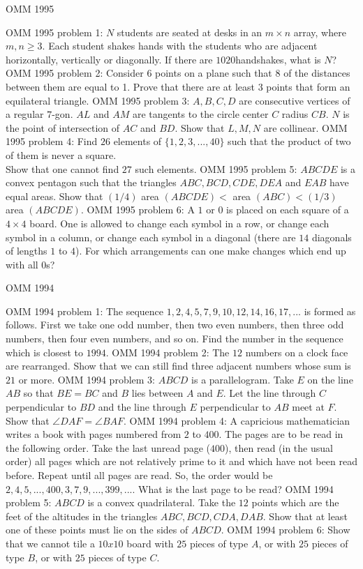 OMM 1995 

OMM 1995 problem 1:  $N$ students are seated at desks in an $m \times  n$ array, where $m, n \ge  3$. Each student shakes hands with the students who are adjacent horizontally, vertically or diagonally. If there are $1020 $handshakes, what is $N$? 
OMM 1995 problem 2:  Consider 6 points on a plane such that 8 of the distances between them are equal to 1. Prove that there are at least 3 points that form an equilateral triangle. 
OMM 1995 problem 3:  $A, B, C, D$ are consecutive vertices of a regular $7$-gon. $AL$ and $AM$ are tangents to the circle center $C$ radius $CB$. $N$ is the point of intersection of $AC$ and $BD$. Show that $L, M, N$ are collinear. 
OMM 1995 problem 4:  Find $26$ elements of $\{1, 2, 3, ... , 40\}$ such that the product of two of them is never a square. \\
Show that one cannot find $27$ such elements. 
OMM 1995 problem 5:  $ABCDE$ is a convex pentagon such that the triangles $ABC, BCD, CDE, DEA$ and $EAB$ have equal areas. Show that $(1/4)$ area $(ABCDE) <$ area $(ABC) < (1/3)$ area $(ABCDE)$. 
OMM 1995 problem 6:  A $1$ or $0$ is placed on each square of a $4 \times  4$ board. One is allowed to change each symbol in a row, or change each symbol in a column, or change each symbol in a diagonal (there are $14$ diagonals of lengths $1$ to $4$). For which arrangements can one make changes which end up with all $0$s? 

OMM 1994 

OMM 1994 problem 1:  The sequence $1, 2, 4, 5, 7, 9 ,10, 12, 14, 16, 17, ... $ is formed as follows. First we take one odd number, then two even numbers, then three odd numbers, then four even numbers, and so on. Find the number in the sequence which is closest to $1994$. 
OMM 1994 problem 2:  The $12$ numbers on a clock face are rearranged. Show that we can still find three adjacent numbers whose sum is $21$ or more. 
OMM 1994 problem 3:  $ABCD$ is a parallelogram. Take $E$ on the line $AB$ so that $BE = BC$ and $B$ lies between $A$ and $E$. Let the line through $C$ perpendicular to $BD$ and the line through $E$ perpendicular to $AB$ meet at $F$. Show that $\angle DAF = \angle BAF$. 
OMM 1994 problem 4:  A capricious mathematician writes a book with pages numbered from $2$ to $400$. The pages are to be read in the following order. Take the last unread page ($400$), then read (in the usual order) all pages which are not relatively prime to it and which have not been read before. Repeat until all pages are read. So, the order would be $2, 4, 5, ... , 400, 3, 7, 9, ... , 399, ...$. What is the last page to be read? 
OMM 1994 problem 5:  $ABCD$ is a convex quadrilateral. Take the $12$ points which are the feet of the altitudes in the triangles $ABC, BCD, CDA, DAB$. Show that at least one of these points must lie on the sides of $ABCD$. 
OMM 1994 problem 6:  Show that we cannot tile a $10 x 10$ board with $25$ pieces of type $A$, or with $25$ pieces of type $B$, or with $25$ pieces of type $C$. 

